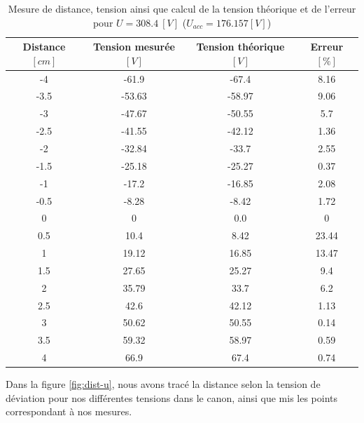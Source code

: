 \documentclass[11pt]{article}
\begin{document}
\begin{table}[H]
\center
\begin{tabular}{|c|>{\columncolor{lightgray}}c|c|>{\columncolor{lightgray}}c|}
\hline
\rowcolor{gray} Distance $[cm]$ & Tension mesurée $[V]$ & Tension théorique $[V]$ & Erreur $[\%]$ \\ \hline
-4 &   -61.9 & -67.4 & 8.16 \\ \hline
-3.5 & -53.63 & -58.97 & 9.06 \\ \hline 
-3 &  -47.67 & -50.55 & 5.7 \\ \hline
-2.5 & -41.55 & -42.12 & 1.36 \\ \hline 
-2 &  -32.84 & -33.7 & 2.55 \\ \hline
-1.5 & -25.18 & -25.27 & 0.37 \\ \hline 
-1 &  -17.2 & -16.85 & 2.08 \\ \hline
-0.5 & -8.28 & -8.42 & 1.72 \\ \hline 
0 &  0 & 0.0 & 0 \\ \hline
0.5 &  10.4 & 8.42 & 23.44 \\ \hline
1 &  19.12 & 16.85 & 13.47 \\ \hline
1.5 &  27.65 & 25.27 & 9.4 \\ \hline
2 &  35.79 & 33.7 & 6.2 \\ \hline
2.5 &  42.6 & 42.12 & 1.13 \\ \hline
3 &  50.62 & 50.55 & 0.14 \\ \hline
3.5 &  59.32 & 58.97 & 0.59 \\ \hline
4 &  66.9 & 67.4 & 0.74 \\ \hline
\end{tabular}
\caption{Mesure de distance, tension ainsi que calcul de la tension théorique et de l'erreur pour $U=308.4 \ [V]$ ($U_{acc} = 176.157 [V]$)}
\label{table:u_308}
\end{table}

Dans la figure \ref{fig:dist-u}, nous avons tracé la distance selon la tension de déviation pour nos différentes tensions dans le canon, ainsi que mis les points correspondant à nos mesures.
\end{document}
